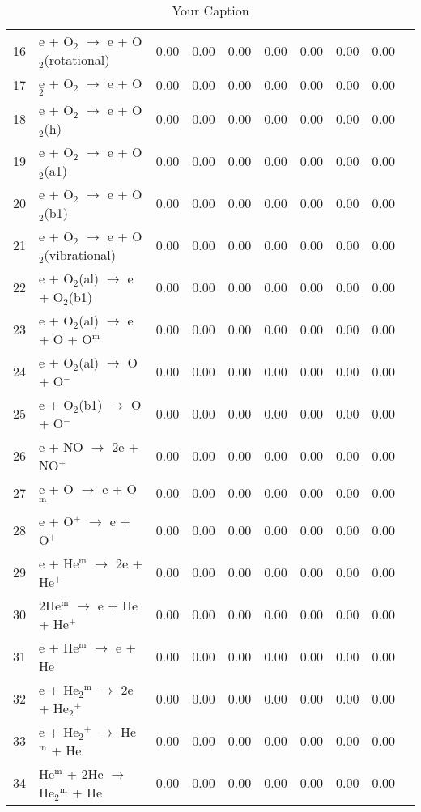 \documentclass{article}
\begin{document}
\begin{table}[H]
{\begin{tabu}{clcccccccc}
      16 & e + O$_{2}$ $\rightarrow$ e + O$_{2}$(rotational) & 0.00 & 0.00 & 0.00 & 0.00 & 0.00 & 0.00 & 0.00 &  \\
      17 & e + O$_{2}$ $\rightarrow$ e + O$_{2}$ & 0.00 & 0.00 & 0.00 & 0.00 & 0.00 & 0.00 & 0.00 &  \\
      18 & e + O$_{2}$ $\rightarrow$ e + O$_{2}$(h) & 0.00 & 0.00 & 0.00 & 0.00 & 0.00 & 0.00 & 0.00 &  \\
      19 & e + O$_{2}$ $\rightarrow$ e + O$_{2}$(a1) & 0.00 & 0.00 & 0.00 & 0.00 & 0.00 & 0.00 & 0.00 &  \\
      20 & e + O$_{2}$ $\rightarrow$ e + O$_{2}$(b1) & 0.00 & 0.00 & 0.00 & 0.00 & 0.00 & 0.00 & 0.00 &  \\
      21 & e + O$_{2}$ $\rightarrow$ e + O$_{2}$(vibrational) & 0.00 & 0.00 & 0.00 & 0.00 & 0.00 & 0.00 & 0.00 &  \\
      22 & e + O$_{2}$(al) $\rightarrow$ e + O$_{2}$(b1) & 0.00 & 0.00 & 0.00 & 0.00 & 0.00 & 0.00 & 0.00 &  \\
      23 & e + O$_{2}$(al) $\rightarrow$ e + O + O$^\text{m}$ & 0.00 & 0.00 & 0.00 & 0.00 & 0.00 & 0.00 & 0.00 &  \\
      24 & e + O$_{2}$(al) $\rightarrow$ O + O$^{-}$ & 0.00 & 0.00 & 0.00 & 0.00 & 0.00 & 0.00 & 0.00 &  \\
      25 & e + O$_{2}$(b1) $\rightarrow$ O + O$^{-}$ & 0.00 & 0.00 & 0.00 & 0.00 & 0.00 & 0.00 & 0.00 &  \\
      26 & e + NO $\rightarrow$ 2e + NO$^{+}$ & 0.00 & 0.00 & 0.00 & 0.00 & 0.00 & 0.00 & 0.00 &  \\
      27 & e + O $\rightarrow$ e + O$^\text{m}$ & 0.00 & 0.00 & 0.00 & 0.00 & 0.00 & 0.00 & 0.00 &  \\
      28 & e + O$^{+}$ $\rightarrow$ e + O$^{+}$ & 0.00 & 0.00 & 0.00 & 0.00 & 0.00 & 0.00 & 0.00 &  \\
      29 & e + He$^\text{m}$ $\rightarrow$ 2e + He$^{+}$ & 0.00 & 0.00 & 0.00 & 0.00 & 0.00 & 0.00 & 0.00 &  \\
      30 & 2He$^\text{m}$ $\rightarrow$ e + He + He$^{+}$ & 0.00 & 0.00 & 0.00 & 0.00 & 0.00 & 0.00 & 0.00 &  \\
      31 & e + He$^\text{m}$ $\rightarrow$ e + He & 0.00 & 0.00 & 0.00 & 0.00 & 0.00 & 0.00 & 0.00 &  \\
      32 & e + He$_2$$^\text{m}$ $\rightarrow$ 2e + He$_{2}$$^{+}$ & 0.00 & 0.00 & 0.00 & 0.00 & 0.00 & 0.00 & 0.00 &  \\
      33 & e + He$_{2}$$^{+}$ $\rightarrow$ He$^\text{m}$ + He & 0.00 & 0.00 & 0.00 & 0.00 & 0.00 & 0.00 & 0.00 &  \\
      34 & He$^\text{m}$ + 2He $\rightarrow$ He$_2$$^\text{m}$ + He & 0.00 & 0.00 & 0.00 & 0.00 & 0.00 & 0.00 & 0.00 &  \\
    \end{tabu}
  }
  \caption{Your Caption}
  \label{tab:rxns}
\end{table}
\end{document}
